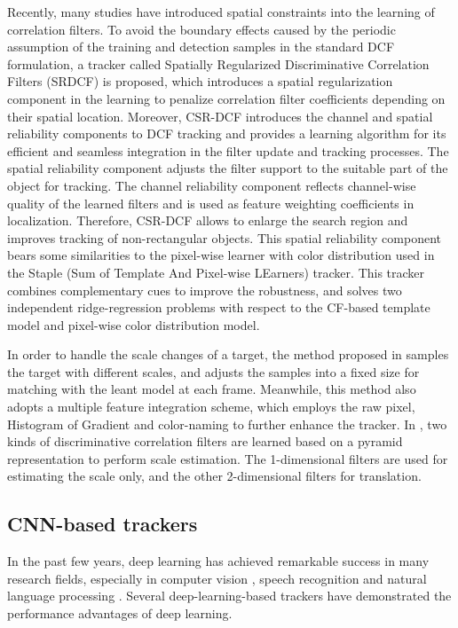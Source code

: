 \documentclass[review]{elsarticle}
\newcommand{\HL}[1]{\textcolor[rgb]{1.00,0.00,0.00}{#1}}
\begin{document}
\begin{CJK*}{UTF8}{gbsn}
Recently, many studies \cite{Danelljan2015LearningSR, Lukezic2017DiscriminativeCF} have introduced spatial constraints into the learning of correlation filters.
To avoid the boundary effects caused by the periodic assumption of the training and detection samples in the standard DCF formulation, \HL{a tracker called} Spatially Regularized Discriminative Correlation Filters (SRDCF) \HL{\cite{Danelljan2015LearningSR} is proposed}, which \HL{introduces} a spatial regularization component in the learning to penalize correlation filter coefficients depending on their spatial location.
\HL{Moreover,} CSR-DCF \cite{Lukezic2017DiscriminativeCF} introduces the channel and spatial reliability components to DCF tracking and provides a learning algorithm for its efficient and seamless integration in the filter update \HL{and tracking processes}. The spatial reliability component adjusts the filter support to \HL{the suitable part} of the object for tracking. The channel reliability component reflects channel-wise quality of the learned filters and is used as feature weighting coefficients in localization. Therefore, CSR-DCF allows to enlarge the search region and improves tracking of non-rectangular objects. \HL{This spatial reliability component bears some similarities to the pixel-wise learner with color distribution used in the Staple (Sum of Template And  Pixel-wise LEarners) \cite{Bertinetto2016StapleC} tracker. This tracker combines complementary cues to improve the robustness, and solves two independent ridge-regression problems with respect to the CF-based template model and pixel-wise color distribution model.}

\HL{In order to handle the scale changes of a target}, \HL{the method proposed in \cite{Li2014ASA} samples} the target with different scales, and \HL{adjusts} the samples into a fixed size for \HL{matching} with the leant model at each frame. Meanwhile, \HL{this method also adopts} a multiple feature integration scheme, which employs the raw pixel, Histogram of Gradient \cite{Forsyth2014ObjectDW} and color-naming \cite{Weijer2009LearningCN} to further enhance the tracker.
\HL{In \cite{Danelljan2017DiscriminativeSS}, two kinds of discriminative correlation filters are learned based on a pyramid representation} to perform scale estimation. \HL{The 1-dimensional} filters are used for estimating the scale only,  \HL{and the other 2-dimensional filters for translation.}

\subsection{CNN-based trackers}
In the past few years, deep learning \cite{Goodfellow2015DeepL} has achieved remarkable success in many research fields, especially in computer vision \cite{Girshick2016RegionBasedCN, Schroff2015FaceNetAU}, speech recognition \cite{Kim2016JointCB, Wu2015DeepNN} and natural language processing \cite{Vinyals2014GrammarAA, Bahdanau2014NeuralMT}. Several deep-learning-based trackers have demonstrated the performance advantages of deep learning. 


\end{CJK*}
\end{document}
